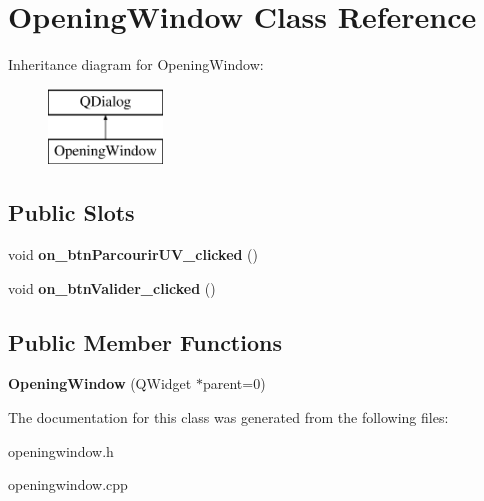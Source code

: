 \hypertarget{class_opening_window}{\section{Opening\+Window Class Reference}
\label{class_opening_window}
}
Inheritance diagram for Opening\+Window\+:\begin{figure}[H]
\begin{center}
\leavevmode
\includegraphics[height=2.000000cm]{class_opening_window}
\end{center}
\end{figure}
\subsection*{Public Slots}
\begin{DoxyCompactItemize}
\item 
\hypertarget{class_opening_window_ad907bae806ede3093d7728ae241d339b}{void {\bfseries on\+\_\+btn\+Parcourir\+U\+V\+\_\+clicked} ()}\label{class_opening_window_ad907bae806ede3093d7728ae241d339b}

\item 
\hypertarget{class_opening_window_a9567830af2746733276c62ce6f7b5e8e}{void {\bfseries on\+\_\+btn\+Valider\+\_\+clicked} ()}\label{class_opening_window_a9567830af2746733276c62ce6f7b5e8e}

\end{DoxyCompactItemize}
\subsection*{Public Member Functions}
\begin{DoxyCompactItemize}
\item 
\hypertarget{class_opening_window_a0ddf01651a723d237c90a541d7b0c79b}{{\bfseries Opening\+Window} (Q\+Widget $\ast$parent=0)}\label{class_opening_window_a0ddf01651a723d237c90a541d7b0c79b}

\end{DoxyCompactItemize}


The documentation for this class was generated from the following files\+:\begin{DoxyCompactItemize}
\item 
openingwindow.\+h\item 
openingwindow.\+cpp\end{DoxyCompactItemize}
